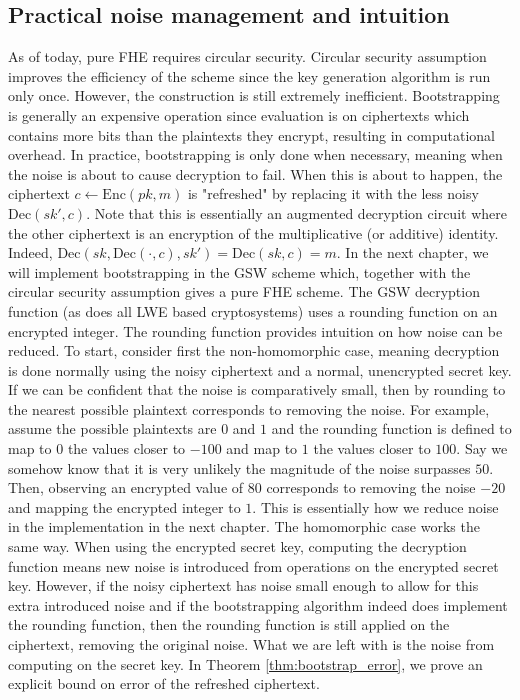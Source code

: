 \subsection*{Practical noise management and intuition}
As of today, pure FHE requires circular security. Circular security assumption improves the efficiency of the scheme since the key generation algorithm is run only once. However, the construction is still extremely inefficient. Bootstrapping is generally an expensive operation since evaluation is on ciphertexts which contains more bits than the plaintexts they encrypt, resulting in computational overhead. In practice, bootstrapping is only done when necessary, meaning when the noise is about to cause decryption to fail. When this is about to happen, the ciphertext $c \leftarrow \text{Enc}(pk, m)$ is "refreshed" by replacing it with the less noisy $\text{Dec}(sk',c)$. Note that this is essentially an augmented decryption circuit where the other ciphertext is an encryption of the multiplicative (or additive) identity. Indeed, $\text{Dec}(sk,\text{Dec}(\cdot,c), sk') = \text{Dec}(sk,c) = m$. In the next chapter, we will implement bootstrapping in the GSW scheme which, together with the circular security assumption gives a pure FHE scheme. The GSW decryption function (as does all LWE based cryptosystems) uses a rounding function on an encrypted integer. The rounding function provides intuition on how noise can be reduced. To start, consider first the non-homomorphic case, meaning decryption is done normally using the noisy ciphertext and a normal, unencrypted secret key. If we can be confident that the noise is comparatively small, then by rounding to the nearest possible plaintext corresponds to removing the noise. For example, assume the possible plaintexts are $0$ and $1$ and the rounding function is defined to map to $0$ the values closer to $-100$ and map to $1$ the values closer to $100$. Say we somehow know that it is very unlikely the magnitude of the noise surpasses $50$. Then, observing an encrypted value of $80$ corresponds to removing the noise $-20$ and mapping the encrypted integer to $1$. This is essentially how we reduce noise in the implementation in the next chapter. The homomorphic case works the same way. When using the encrypted secret key, computing the decryption function means new noise is introduced from operations on the encrypted secret key. However, if the noisy ciphertext has noise small enough to allow for this extra introduced noise and if the bootstrapping algorithm indeed does implement the rounding function, then the rounding function is still applied on the ciphertext, removing the original noise. What we are left with is the noise from computing on the secret key. In Theorem \ref{thm:bootstrap_error}, we prove an explicit bound on error of the refreshed ciphertext.